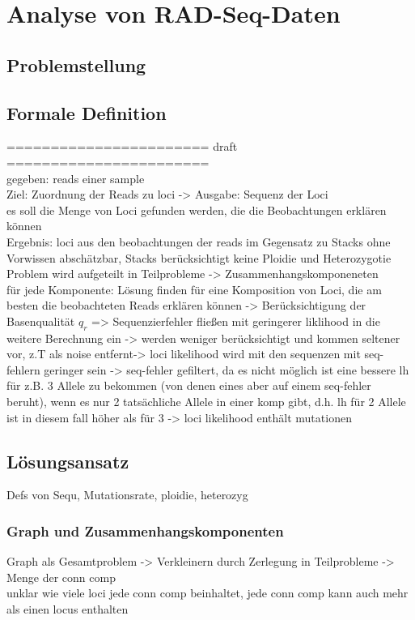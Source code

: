 \chapter{Analyse von RAD-Seq-Daten} \label{chapter:kap2}
\section{Problemstellung} \label{sec:probl}
\section{Formale Definition} \label{sec:formal}

\noindent======================= draft =======================\\


gegeben: reads einer sample \\
Ziel: Zuordnung der Reads zu loci -> Ausgabe: Sequenz der Loci \\
es soll die Menge von Loci gefunden werden, die die Beobachtungen erklären können \\
Ergebnis: loci aus den beobachtungen der reads
im Gegensatz zu Stacks ohne Vorwissen abschätzbar, Stacks berücksichtigt keine Ploidie und Heterozygotie \\


Problem wird aufgeteilt in Teilprobleme -> Zusammenhangskomponeneten \\
für jede Komponente: Lösung finden für eine Komposition von Loci, die am besten die beobachteten Reads erklären können
-> Berücksichtigung der Basenqualität $q_{r}$ => Sequenzierfehler fließen mit geringerer liklihood in die weitere Berechnung ein -> werden weniger berücksichtigt und kommen seltener vor, z.T als noise entfernt-> loci likelihood wird mit den sequenzen mit seq-fehlern geringer sein -> seq-fehler gefiltert, da es nicht möglich ist eine  bessere lh für z.B. 3 Allele zu bekommen (von denen eines aber auf einem seq-fehler beruht), wenn es nur 2 tatsächliche Allele in einer komp gibt, d.h. lh für 2 Allele ist in diesem fall höher als für 3 -> loci likelihood enthält mutationen \\

\section{Lösungsansatz} \label{sec:solution}
Defs von Sequ, Mutationsrate, ploidie, heterozyg
\subsection{Graph und Zusammenhangskomponenten} \label{subsec:sol_graph}
Graph als Gesamtproblem -> Verkleinern durch Zerlegung in Teilprobleme -> Menge der conn comp\\
unklar wie viele loci jede conn comp beinhaltet, jede conn comp kann auch mehr als einen locus enthalten\\

